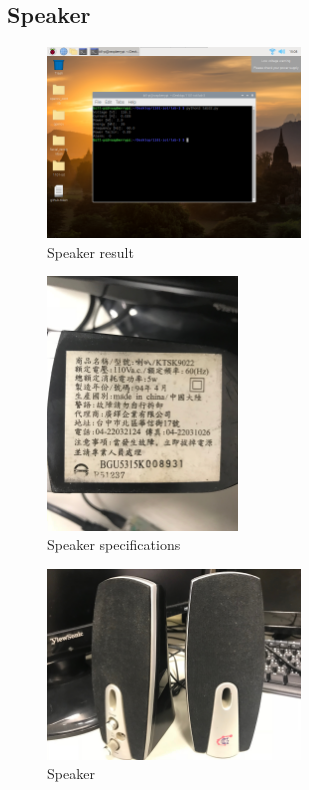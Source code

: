 \documentclass[12pt, a4paper, onside]{article}
\begin{document}
\clearpage

\subsection{Speaker}
\begin{figure}[h]
  \centering
  \includegraphics[width=0.6\textwidth]{img/4_res_speaker}
  \caption{Speaker result}
\end{figure}
\begin{figure}[h]
  \centering
  \includegraphics[angle=-90, origin=c, width=0.45\textwidth]{img/4_spe_speaker}
  \caption{Speaker specifications}
\end{figure}
\begin{figure}[h]
  \centering
  \includegraphics[width=0.6\textwidth]{img/4_pic_speaker}
  \caption{Speaker}
\end{figure}
\end{document}
